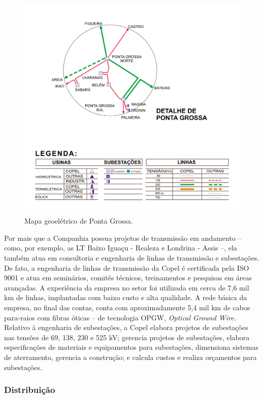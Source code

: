 \documentclass[grad,numbers]{coppe}
\begin{document}
  \begin{figure}[H]
  \includegraphics[width=1\linewidth]{img/mapa_geoeletrico_ponta_grossa} \caption{Mapa geoelétrico de Ponta Grossa.}\label{fig:unnamed-chunk-9}
  \end{figure}
  Por mais que a Companhia possua projetos de transmissão em andamento -- como, por exemplo, as LT Baixo Iguaçu - Realeza e Londrina - Assis --, ela também atua em consultoria e engenharia de linhas de transmissão e subestações. De fato, a engenharia de linhas de transmissão da Copel é certificada pela ISO 9001 e atua em seminários, comitês técnicos, treinamentos e pesquisas em áreas avançadas. A experiência da empresa no setor foi utilizada em cerca de 7,6 mil km de linhas, implantadas com baixo custo e alta qualidade. A rede básica da empresa, no final das contas, conta com aproximadamente 5,4 mil km de cabos para-raios com fibras óticas -- de tecnologia OPGW, \emph{Optical Ground Wire.} Relativo à engenharia de subestações, a Copel elabora projetos de subestações nas tensões de 69, 138, 230 e 525 kV; gerencia projetos de subestações, elabora especificações de materiais e equipamentos para subestações, dimensiona sistemas de aterramento, gerencia a construção; e calcula custos e realiza orçamentos para subestações.

  \hypertarget{distribuiuxe7uxe3o}{%
  \subsubsection{Distribuição}\label{distribuiuxe7uxe3o}}
\end{document}
